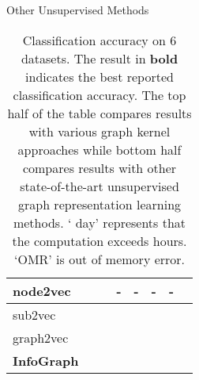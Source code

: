 \documentclass{article} \usepackage{iclr2020_conference,times}
\def\method{InfoGraph}
\begin{document}
\begin{table*}[t!]
    \begin{center}
		Other Unsupervised Methods
	\end{center}
	
	\begin{tabular}{ @{} >{\raggedright}p{2cm} |    K{1.6cm}  !{\vrule width0.8pt} K{1.6cm}  !{\vrule width0.8pt} K{1.6cm} !{\vrule width0.8pt} K{1.6cm}   !{\vrule width0.8pt} K{1.6cm}   !{\vrule width0.8pt}K{1.6cm}   !{\vrule width0.8pt} K{1.6cm} | }	 
		\hline
		node2vec       &   &  & - & - & - & - \\  \hline sub2vec     & &  &  &  &  &  \\  \hline
		graph2vec  & &  &  &  &  &  \\  \hline
		\textbf{\method{}}     & &  &  &  &  & 
 \\  \hline


\end{tabular}
	

	\caption{Classification accuracy on 6 datasets. The result in \textbf{bold} indicates the  best reported classification accuracy. The top half of the table compares results  with various graph kernel approaches while bottom half compares results with other state-of-the-art unsupervised graph representation learning methods. ` day' represents that the computation exceeds  hours. `OMR' is out of memory error.} \label{table:results}
	
\end{table*}
 
\end{document}
